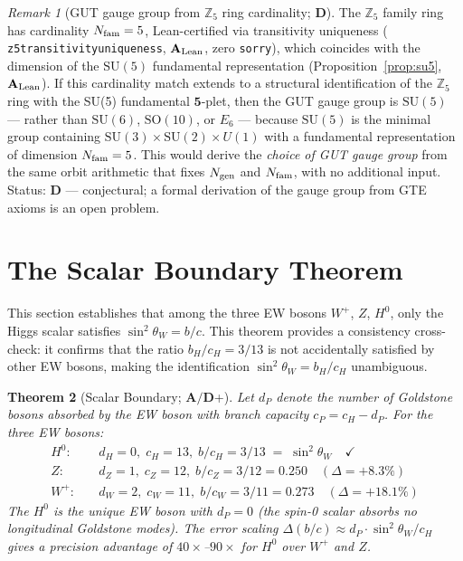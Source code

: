 \documentclass[11pt]{article}
\newtheorem{theorem}{Theorem}[section]
\theoremstyle{remark}
\newtheorem{remark}[theorem]{Remark}
\newcommand{\Ngen}{N_{\rm gen}}
\newcommand{\Nfam}{N_{\rm fam}}
\newcommand{\cH}{c_H}
\newcommand{\lean}[1]{%
  \penalty-100
  \begingroup\def\_{\textunderscore\allowbreak}\texttt{#1}\endgroup}
\newcommand{\sinwsq}{\sin^2\!\theta_W}
\newcommand{\CatAL}{\ensuremath{\textbf{A}_{\rm Lean}}}
\newcommand{\CatAD}{\textbf{A/D}}
\newcommand{\CatD}{\textbf{D}}
\begin{document}
\begin{remark}[GUT gauge group from $\mathbb{Z}_5$ ring cardinality; $\CatD$]
\label{rem:gut_group_z5}
The $\mathbb{Z}_5$ family ring has cardinality $\Nfam = 5$, Lean-certified via
transitivity uniqueness (\lean{z5\_transitivity\_uniqueness}, $\CatAL$,
zero \texttt{sorry}), which coincides with the dimension of the
$\mathrm{SU}(5)$ fundamental representation
(Proposition~\ref{prop:su5}, $\CatAL$).
If this cardinality match extends to a structural identification of the $\mathbb{Z}_5$
ring with the SU(5) fundamental $\mathbf{5}$-plet, then the GUT gauge group is
$\mathrm{SU}(5)$ — rather than $\mathrm{SU}(6)$, $\mathrm{SO}(10)$, or $E_6$ — because
$\mathrm{SU}(5)$ is the minimal group containing $\mathrm{SU}(3) \times \mathrm{SU}(2)
\times U(1)$ with a fundamental representation of dimension $\Nfam = 5$.
This would derive the \emph{choice of GUT gauge group} from the same orbit arithmetic
that fixes $\Ngen$ and $\Nfam$, with no additional input.
Status: $\CatD$ --- conjectural; a formal derivation of the gauge group from GTE axioms
is an open problem.
\end{remark}

\section{The Scalar Boundary Theorem}
\label{sec:scalar}

This section establishes that among the three EW bosons $W^+$, $Z$, $H^0$, only the
Higgs scalar satisfies $\sinwsq = b/c$.
This theorem provides a consistency cross-check: it confirms that the ratio $b_H/c_H = 3/13$
is not accidentally satisfied by other EW bosons, making the identification
$\sin^2\theta_W = b_H/c_H$ unambiguous.

\begin{theorem}[Scalar Boundary; $\CatAD$+]
\label{thm:scalar_boundary}
Let $d_P$ denote the number of Goldstone bosons absorbed by the EW boson with branch
capacity $c_P = \cH - d_P$.  For the three EW bosons:
\begin{align}
  H^0: &\quad d_H = 0,\; c_H = 13,\; b/c_H = 3/13 \;=\; \sinwsq \quad\checkmark \nonumber\\
  Z:   &\quad d_Z = 1,\; c_Z = 12,\; b/c_Z = 3/12 = 0.250 \quad (\Delta = +8.3\%) \nonumber\\
  W^+: &\quad d_W = 2,\; c_W = 11,\; b/c_W = 3/11 = 0.273 \quad (\Delta = +18.1\%) \nonumber
\end{align}
The $H^0$ is the \emph{unique} EW boson with $d_P = 0$ (the spin-0 scalar absorbs no
longitudinal Goldstone modes).  The error scaling $\Delta(b/c) \approx d_P \cdot \sinwsq / \cH$
gives a precision advantage of $40\times$--$90\times$ for $H^0$ over $W^+$ and $Z$.
\end{theorem}
\end{document}
